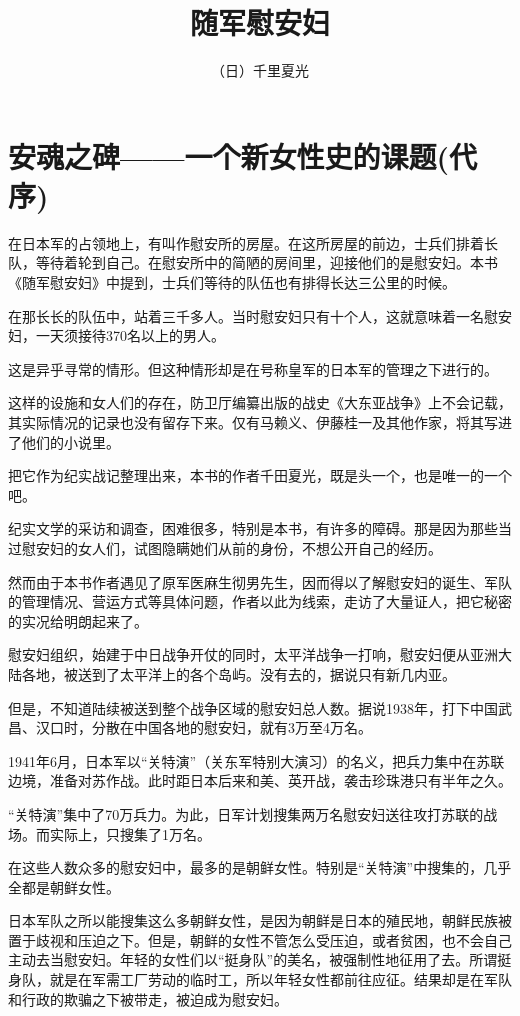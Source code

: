 \documentclass[12pt,UTF8]{ctexbook}
\title{\heiti\zihao{0} 随军慰安妇}
\author{（日）千里夏光}
\date{}
\begin{document}
\maketitle
\tableofcontents

\frontmatter

\chapter{安魂之碑——一个新女性史的课题(代序)}

在日本军的占领地上，有叫作慰安所的房屋。在这所房屋的前边，士兵们排着长队，等待着轮到自己。在慰安所中的简陋的房间里，迎接他们的是慰安妇。本书《随军慰安妇》中提到，士兵们等待的队伍也有排得长达三公里的时候。

在那长长的队伍中，站着三千多人。当时慰安妇只有十个人，这就意味着一名慰安妇，一天须接待370名以上的男人。

这是异乎寻常的情形。但这种情形却是在号称皇军的日本军的管理之下进行的。

这样的设施和女人们的存在，防卫厅编纂出版的战史《大东亚战争》上不会记载，其实际情况的记录也没有留存下来。仅有马赖义、伊藤桂一及其他作家，将其写进了他们的小说里。

把它作为纪实战记整理出来，本书的作者千田夏光，既是头一个，也是唯一的一个吧。

纪实文学的采访和调查，困难很多，特别是本书，有许多的障碍。那是因为那些当过慰安妇的女人们，试图隐瞒她们从前的身份，不想公开自己的经历。

然而由于本书作者遇见了原军医麻生彻男先生，因而得以了解慰安妇的诞生、军队的管理情况、营运方式等具体问题，作者以此为线索，走访了大量证人，把它秘密的实况给明朗起来了。

慰安妇组织，始建于中日战争开仗的同时，太平洋战争一打响，慰安妇便从亚洲大陆各地，被送到了太平洋上的各个岛屿。没有去的，据说只有新几内亚。

但是，不知道陆续被送到整个战争区域的慰安妇总人数。据说1938年，打下中国武昌、汉口时，分散在中国各地的慰安妇，就有3万至4万名。

1941年6月，日本军以“关特演”（关东军特别大演习）的名义，把兵力集中在苏联边境，准备对苏作战。此时距日本后来和美、英开战，袭击珍珠港只有半年之久。

“关特演”集中了70万兵力。为此，日军计划搜集两万名慰安妇送往攻打苏联的战场。而实际上，只搜集了1万名。

在这些人数众多的慰安妇中，最多的是朝鲜女性。特别是“关特演”中搜集的，几乎全都是朝鲜女性。

日本军队之所以能搜集这么多朝鲜女性，是因为朝鲜是日本的殖民地，朝鲜民族被置于歧视和压迫之下。但是，朝鲜的女性不管怎么受压迫，或者贫困，也不会自己主动去当慰安妇。年轻的女性们以“挺身队”的美名，被强制性地征用了去。所谓挺身队，就是在军需工厂劳动的临时工，所以年轻女性都前往应征。结果却是在军队和行政的欺骗之下被带走，被迫成为慰安妇。
\end{document}
